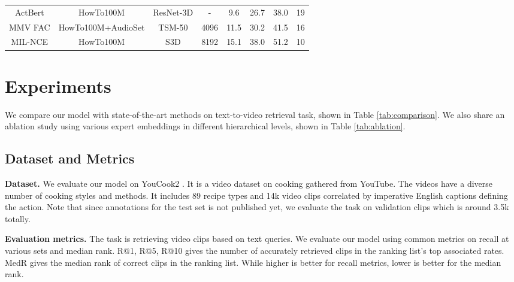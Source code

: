 \documentclass{article}
\begin{document}
\begin{table*}[htb!]
\begin{tabular}{|c|c|c|c|c|c|c|c|}
ActBert \cite{Zhu_2020_Actbert}        & HowTo100M             & ResNet-3D                & -                   & 9.6          & 26.7          & 38.0          & 19            \\ 
MMV FAC \cite{alayrac2020selfsupervised}        & HowTo100M+AudioSet    & TSM-50                   & 4096                & 11.5         & 30.2          & 41.5          & 16            \\ 
MIL-NCE \cite{miech20endtoend}        & HowTo100M             & S3D                      & 8192                & 15.1         & 38.0          & 51.2          & 10            \\ \hline
\end{tabular}
\end{table*}

\section{Experiments}

We compare our model with state-of-the-art methods on text-to-video retrieval task, shown in Table \ref{tab:comparison}. We also share an ablation study using various expert embeddings in different hierarchical levels, shown in Table \ref{tab:ablation}.

\subsection{Dataset and Metrics}

\textbf{Dataset.} We evaluate our model on YouCook2 \cite{ZhXuCoAAAI18}. It is a video dataset on cooking gathered from YouTube. The videos have a diverse number of cooking styles and methods. It includes 89 recipe types and 14k video clips correlated by imperative English captions defining the action. Note that since annotations for the test set is not published yet, we evaluate the task on validation clips which is around 3.5k totally. 

\textbf{Evaluation metrics.} The task is retrieving video clips based on text queries. We evaluate our model using common metrics on recall at various sets and median rank. R@1, R@5, R@10 gives the number of accurately retrieved clips in the ranking list's top associated rates.  MedR gives the median rank of correct clips in the ranking list. While higher is better for recall metrics, lower is better for the median rank.
\end{document}

